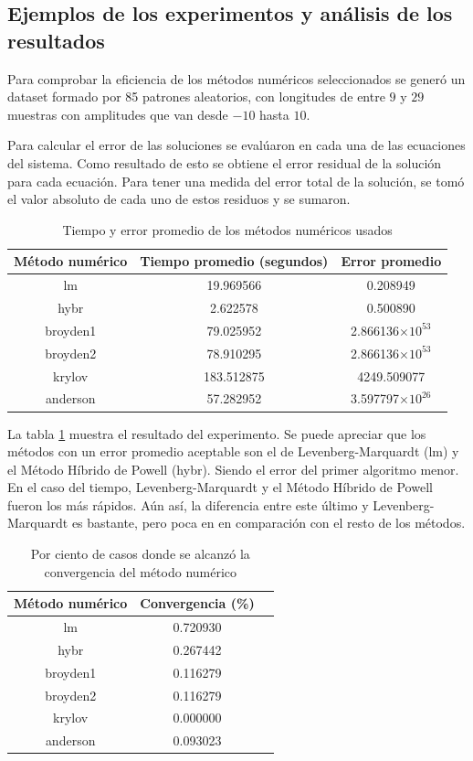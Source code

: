 \subsection{Ejemplos de los experimentos y análisis de los resultados}

Para comprobar la eficiencia de los métodos numéricos seleccionados se generó un dataset formado por 85 patrones aleatorios, con longitudes de entre $9$ y $29$ muestras
con amplitudes que van desde $-10$ hasta $10$.

Para calcular el error de las soluciones se evalúaron en cada una de las ecuaciones del sistema. Como resultado
de esto se obtiene el error residual de la solución para cada ecuación. Para tener una medida del error total
de la solución, se tomó el valor absoluto de cada uno de estos residuos y se sumaron.

\begin{table}
	\centering
	\caption{Tiempo y error promedio de los métodos numéricos usados} \label{table:numerical-error}
	\begin{tabular}{|c|c|c|} \toprule
		Método numérico  & Tiempo promedio (segundos) & Error promedio \\ \midrule 
		lm & 19.969566 & 0.208949 \\ 
		hybr & 2.622578 & 0.500890 \\
		broyden1 & 79.025952 & 2.866136$\times 10^{53}$\\
		broyden2 & 78.910295 & 2.866136$\times 10^{53}$\\
		krylov & 183.512875 & 4249.509077 \\
		anderson & 57.282952 & 3.597797$\times 10^{26}$\\ \bottomrule
	\end{tabular}
\end{table}

La tabla \ref{table:numerical-error} muestra el resultado del experimento. Se puede apreciar que los métodos 
con un error promedio aceptable son el de Levenberg-Marquardt (lm) y el Método Híbrido de Powell (hybr). 
Siendo el error del primer algoritmo menor.
En el caso del tiempo, Levenberg-Marquardt y el Método Híbrido de Powell fueron los más rápidos. Aún así, la
diferencia entre este último y Levenberg-Marquardt es bastante, pero poca en en comparación con el resto de los métodos.

\begin{table}
	\centering
	\caption{Por ciento de casos donde se alcanzó la convergencia del método numérico} \label{table:numerical-convergence}
	\begin{tabular}{|c|c|c|} \toprule
		Método numérico & Convergencia (\%)\\ \midrule
		lm & 0.720930 \\
		hybr & 0.267442 \\
		broyden1 & 0.116279 \\
		broyden2 & 0.116279 \\
		krylov & 0.000000 \\
		anderson & 0.093023 \\ \bottomrule
	\end{tabular}
\end{table}

